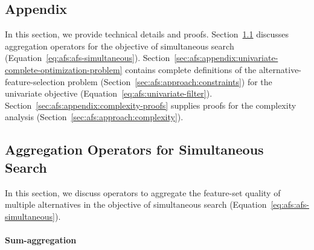 \documentclass[iicol, sn-basic, Numbered]{sn-jnl} %
\theoremstyle{plain}
\theoremstyle{definition}
\begin{document}
\begin{appendices}

\section{Appendix}
\label{sec:afs:appendix}

In this section, we provide technical details and proofs.
Section~\ref{sec:afs:appendix:simultaneous-objective-aggregation} discusses aggregation operators for the objective of simultaneous search (Equation~\ref{eq:afs:afs-simultaneous}).
Section~\ref{sec:afs:appendix:univariate-complete-optimization-problem} contains complete definitions of the alternative-feature-selection problem (Section~\ref{sec:afs:approach:constraints}) for the univariate objective (Equation~\ref{eq:afs:univariate-filter}).
Section~\ref{sec:afs:appendix:complexity-proofs} supplies proofs for the complexity analysis (Section~\ref{sec:afs:approach:complexity}).

\subsection{Aggregation Operators for Simultaneous Search}
\label{sec:afs:appendix:simultaneous-objective-aggregation}

In this section, we discuss operators to aggregate the feature-set quality of multiple alternatives in the objective of simultaneous search (Equation~\ref{eq:afs:afs-simultaneous}).

\paragraph{Sum-aggregation}


\end{appendices}
\end{document}
